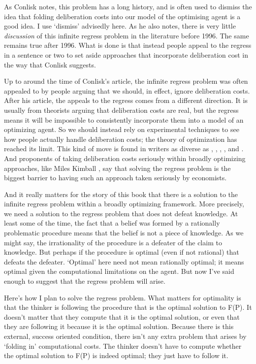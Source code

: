\documentclass[
  11pt,
]{book}
\begin{document}
As Conlisk notes, this problem has a long history, and is often used to dismiss the idea that folding deliberation costs into our model of the optimising agent is a good idea. I use `dismiss' advisedly here. As he also notes, there is very little \emph{discussion} of this infinite regress problem in the literature before 1996. The same remains true after 1996. What is done is that instead people appeal to the regress in a sentence or two to set aside approaches that incorporate deliberation cost in the way that Conlisk suggests.

Up to around the time of Conlisk's article, the infinite regress problem was often appealed to by people arguing that we should, in effect, ignore deliberation costs. After his article, the appeals to the regress comes from a different direction. It is usually from theorists arguing that deliberation costs are real, but the regress means it will be impossible to consistently incorporate them into a model of an optimizing agent. So we should instead rely on experimental techniques to see how people actually handle deliberation costs; the theory of optimization has reached its limit. This kind of move is found in writers as diverse as \citet{GigerenzerSelton2001}, \citet{Odell2002}, \citet{Pingle2006}, \citet{ManganEtAl2010}, \citet{OgakiTanaka2017} and \citet{Chakravarti2017}. And proponents of taking deliberation costs seriously within broadly optimizing approaches, like Miles Kimball \citeyearpar{Kimball2015}, say that solving the regress problem is the biggest barrier to having such an approach taken seriously by economists.

And it really matters for the story of this book that there is a solution to the infinite regress problem within a broadly optimizing framework. More precisely, we need a solution to the regress problem that does not defeat knowledge. At least some of the time, the fact that a belief was formed by a rationally problematic procedure means that the belief is not a piece of knowledge. As we might say, the irrationality of the procedure is a defeater of the claim to knowledge. But perhaps if the procedure is optimal (even if not rational) that defeats the defeater. `Optimal' here need not mean rationally optimal; it means optimal given the computational limitations on the agent. But now I've said enough to suggest that the regress problem will arise.

Here's how I plan to solve the regress problem. What matters for optimality is that the thinker is following the procedure that is the optimal solution to F(P). It doesn't matter that they compute that it is the optimal solution, or even that they are following it because it is the optimal solution. Because there is this external, success oriented condition, there isn't any extra problem that arises by `folding in' computational costs. The thinker doesn't have to compute whether the optimal solution to F(P) is indeed optimal; they just have to follow it.
\end{document}
